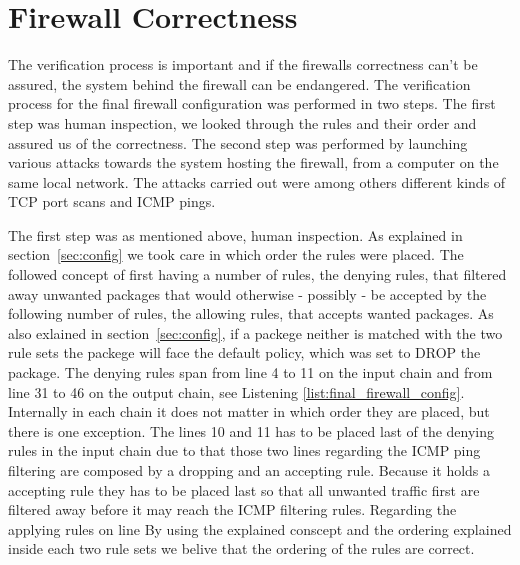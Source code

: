 \section{Firewall Correctness}
\label{sec:correctness}

The verification process is important and if the firewalls correctness can't be assured, the system behind the firewall can be endangered. The verification process for the final firewall configuration was performed in two steps. The first step was human inspection, we looked through the rules and their order and assured us of the correctness. The second step was performed by launching various attacks towards the system hosting the firewall, from a computer on the same local network. The attacks carried out were among others different kinds of TCP port scans and ICMP pings.

The first step was as mentioned above, human inspection. As explained in section~\ref{sec:config} we took care in which order the rules were placed. The followed concept of first having a number of rules, the denying rules, that filtered away unwanted packages that would otherwise - possibly - be accepted by the following number of rules, the allowing rules, that accepts wanted packages. As also exlained in section~\ref{sec:config}, if a packege neither is matched with the two rule sets the packege will face the default policy, which was set to DROP the package. The denying rules span from line 4 to 11 on the input chain and from line 31 to 46 on the output chain, see Listening \ref{list:final_firewall_config}. Internally in each chain it does not matter in which order they are placed, but there is one exception. The lines 10 and 11 has to be placed last of the denying rules in the input chain due to that those two lines regarding the ICMP ping filtering are composed by a dropping and an accepting rule. Because it holds a accepting rule they has to be placed last so that all unwanted traffic first are filtered away before it may reach the ICMP filtering rules. Regarding the applying rules on line By using the explained conscept and the ordering explained inside each two rule sets we belive that the ordering of the rules are correct.



